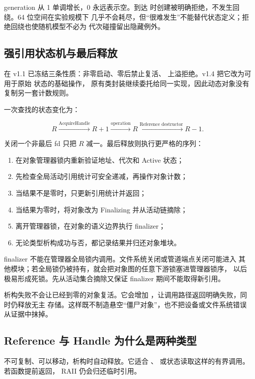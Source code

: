 generation 从 1 单调增长，0 永远表示空。到达
 时创建被明确拒绝，不发生回绕。64 位空间在实验规模下
几乎不会耗尽，但“很难发生”不能替代状态定义；拒绝回绕也使随机模型不必为
代次碰撞留出隐藏例外。

\subsection{强引用状态机与最后释放}

 在 v1.1 已冻结三条性质：非零启动、零后禁止复活、
上溢拒绝。v1.4 把它改为可用于原始  状态的基础操作，
原有类封装继续委托给同一实现，因此动态对象没有复制另一套计数规则。

一次查找的状态变化为：

\[
  R \xrightarrow{\text{AcquireHandle}} R+1
    \xrightarrow{\text{operation}}
  R \xrightarrow{\text{Reference destructor}} R-1.
\]

关闭一个非最后 fd 只把 \(R\) 减一。最后释放则执行更严格的序列：

\begin{enumerate}
  \item 在对象管理器锁内重新验证地址、代次和 Active 状态；
  \item 先检查全局活动引用统计可安全递减，再操作对象计数；
  \item 当结果不是零时，只更新引用统计并返回；
  \item 当结果为零时，将对象改为 Finalizing 并从活动链摘除；
  \item 离开管理器锁，在对象的语义边界执行 finalizer；
  \item 无论类型析构成功与否，都记录结果并归还对象堆块。
\end{enumerate}

finalizer 不能在管理器全局锁内调用。文件系统关闭或管道端点关闭可能进入
其他模块；若全局锁仍被持有，就会把对象图的任意下游锁塞进管理器锁序，
以后极易形成死锁。先从活动集合摘除又保证 finalizer 期间不能取得新引用。

析构失败不会让已经到零的对象复活。它会增加
，让调用路径返回明确失败，同时仍释放无主
存储。这样既不制造悬空“僵尸对象”，也不把设备或文件系统错误从证据中抹掉。

\subsection{Reference 与 Handle 为什么是两种类型}

 不可复制、可以移动，析构时自动释放。它适合
、 或状态读取这样的有界调用。若函数提前返回，
RAII 仍会归还临时引用。

